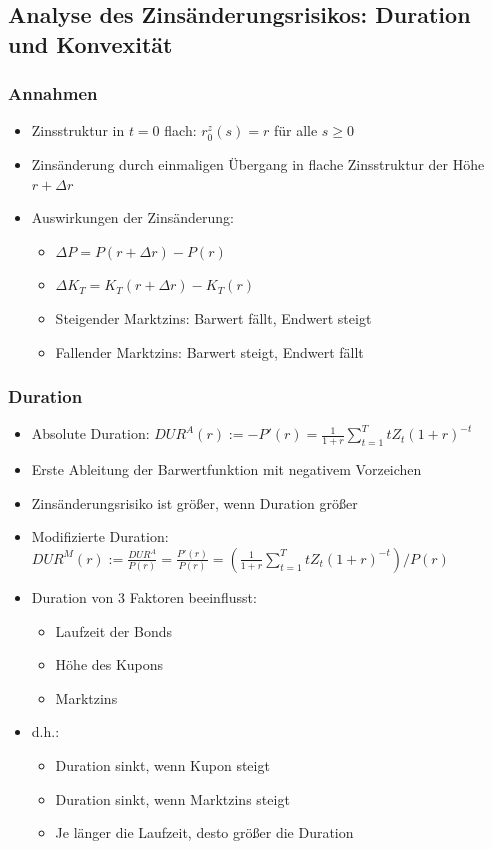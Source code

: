 \documentclass[12pt]{report}
\theoremstyle{dotless}
\theoremstyle{definition}
\begin{document}
\subsection{Analyse des Zins\"anderungsrisikos: Duration und Konvexit\"at}

\subsubsection{Annahmen}

\begin{itemize}
	\item Zinsstruktur in $t=0$ flach: $r_0^z (s) = r$ f\"ur alle $s \geq 0$
	\item Zins\"anderung durch einmaligen \"Ubergang in flache Zinsstruktur der H\"ohe $r + \Delta r$
	\item Auswirkungen der Zins\"anderung:
	\begin{itemize}
		\item $\Delta P = P(r + \Delta r) -P(r)$
		\item $\Delta K_T = K_T(r + \Delta r) - K_T(r)$
		\item Steigender Marktzins: Barwert f\"allt, Endwert steigt
		\item Fallender Marktzins: Barwert steigt, Endwert f\"allt
	\end{itemize}
\end{itemize}

\subsubsection{Duration}

\begin{itemize}
	\item Absolute Duration: $DUR^A(r):= -P'(r) = \frac{1}{1+r} \sum_{t=1}^T t Z_t(1+r)^{-t}$
	\item Erste Ableitung der Barwertfunktion mit negativem Vorzeichen
	\item Zins\"anderungsrisiko ist gr\"o{\ss}er, wenn Duration gr\"o{\ss}er
	\item Modifizierte Duration: $DUR^M(r) := \frac{DUR^A}{P(r)} = \frac{P'(r)}{P(r)} = (\frac{1}{1+r}  \sum_{t=1}^T tZ_t(1+r)^{-t}) / P(r)$
	\item Duration von 3 Faktoren beeinflusst:
	\begin{itemize}
		\item Laufzeit der Bonds
		\item H\"ohe des Kupons
		\item Marktzins
	\end{itemize}
	\item d.h.:
	\begin{itemize}
		\item Duration sinkt, wenn Kupon steigt
		\item Duration sinkt, wenn Marktzins steigt
		\item Je l\"anger die Laufzeit, desto gr\"o{\ss}er die Duration
	\end{itemize}
\end{itemize}
\end{document}

